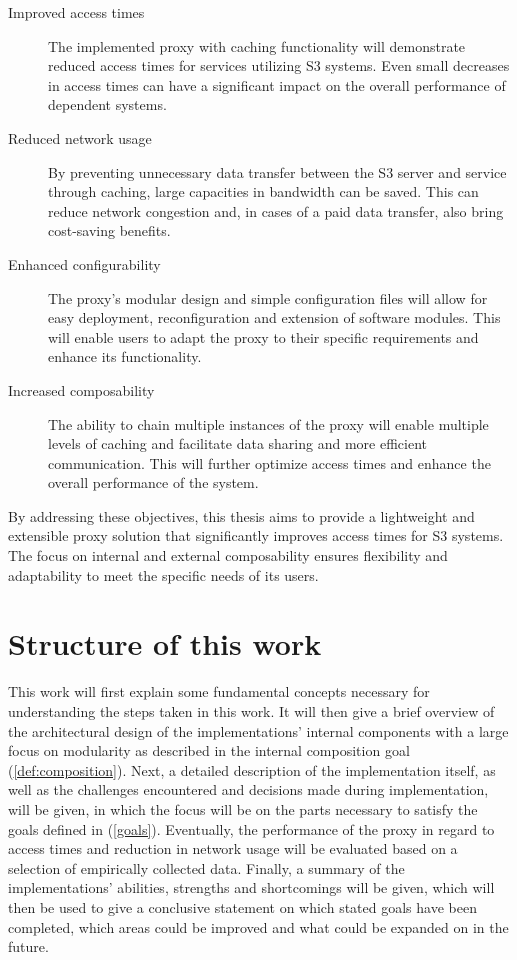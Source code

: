 \begin{description}
	\item[Improved access times] The implemented proxy with caching functionality will demonstrate reduced access times for services utilizing S3 systems. Even small decreases in access times can have a significant impact on the overall performance of dependent systems.
	\item[Reduced network usage] By preventing unnecessary data transfer between the S3 server and service through caching, large capacities in bandwidth can be saved. This can reduce network congestion and, in cases of a paid data transfer, also bring cost-saving benefits.
	\item[Enhanced configurability] The proxy's modular design and simple configuration files will allow for easy deployment, reconfiguration and extension of software modules. This will enable users to adapt the proxy to their specific requirements and enhance its functionality.
	\item[Increased composability] The ability to chain multiple instances of the proxy will enable multiple levels of caching and facilitate data sharing and more efficient communication. This will further optimize access times and enhance the overall performance of the system.
\end{description}

By addressing these objectives, this thesis aims to provide a lightweight and extensible proxy solution that significantly improves access times for S3 systems. The focus on internal and external composability ensures flexibility and adaptability to meet the specific needs of its users.

\section{Structure of this work}

This work will first explain some fundamental concepts necessary for understanding the steps taken in this work. 
It will then give a brief overview of the architectural design of the implementations' internal components with a large focus on modularity as described in the internal composition goal (\ref{def:composition}).
Next, a detailed description of the implementation itself, as well as the challenges encountered and decisions made during implementation, will be given, in which the focus will be on the parts necessary to satisfy the goals defined in (\ref{goals}).
Eventually, the performance of the proxy in regard to access times and reduction in network usage will be evaluated based on a selection of empirically collected data.
Finally, a summary of the implementations' abilities, strengths and shortcomings will be given, which will then be used to give a conclusive statement on which stated goals have been completed, which areas could be improved and what could be expanded on in the future.